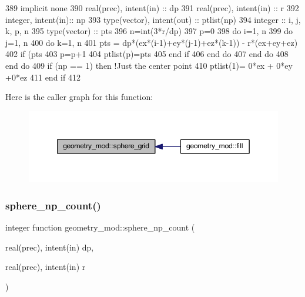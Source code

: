 \begin{DoxyCode}
389     \textcolor{keywordtype}{implicit none}
390     \textcolor{keywordtype}{real(prec)}, \textcolor{keywordtype}{intent(in)} :: dp
391     \textcolor{keywordtype}{real(prec)}, \textcolor{keywordtype}{intent(in)} :: r
392     \textcolor{keywordtype}{integer}, \textcolor{keywordtype}{intent(in)}::  np
393     \textcolor{keywordtype}{type}(vector), \textcolor{keywordtype}{intent(out)} :: ptlist(np)
394     \textcolor{keywordtype}{integer} :: i, j, k, p, n
395     \textcolor{keywordtype}{type}(vector) :: pts
396     n=int(3*r/dp)
397     p=0
398     \textcolor{keywordflow}{do} i=1, n
399         \textcolor{keywordflow}{do} j=1, n
400             \textcolor{keywordflow}{do} k=1, n
401                 pts = dp*(ex*(i-1)+ey*(j-1)+ez*(k-1)) - r*(ex+ey+ez)
402                 \textcolor{keywordflow}{if} (pts%
403                     p=p+1
404                     ptlist(p)=pts
405 \textcolor{keywordflow}{                end if}
406 \textcolor{keywordflow}{            end do}
407 \textcolor{keywordflow}{        end do}
408 \textcolor{keywordflow}{    end do}
409     \textcolor{keywordflow}{if} (np == 1) \textcolor{keywordflow}{then} \textcolor{comment}{!Just the center point}
410         ptlist(1)= 0*ex + 0*ey +0*ez
411 \textcolor{keywordflow}{    end if}
412 
\end{DoxyCode}
Here is the caller graph for this function\+:\nopagebreak
\begin{figure}[H]
\begin{center}
\leavevmode
\includegraphics[width=349pt]{namespacegeometry__mod_a6c03a4ea3de6763940396dbeb3908ebc_icgraph}
\end{center}
\end{figure}
\mbox{\label{namespacegeometry__mod_a05de7940b4e7df5a2b31f3d0414e3743}} 
\subsubsection{\texorpdfstring{sphere\+\_\+np\+\_\+count()}{sphere\_np\_count()}}
{\footnotesize\ttfamily integer function geometry\+\_\+mod\+::sphere\+\_\+np\+\_\+count (\begin{DoxyParamCaption}\item[{real(prec), intent(in)}]{dp,  }\item[{real(prec), intent(in)}]{r }\end{DoxyParamCaption})\hspace{0.3cm}{\ttfamily [private]}}



